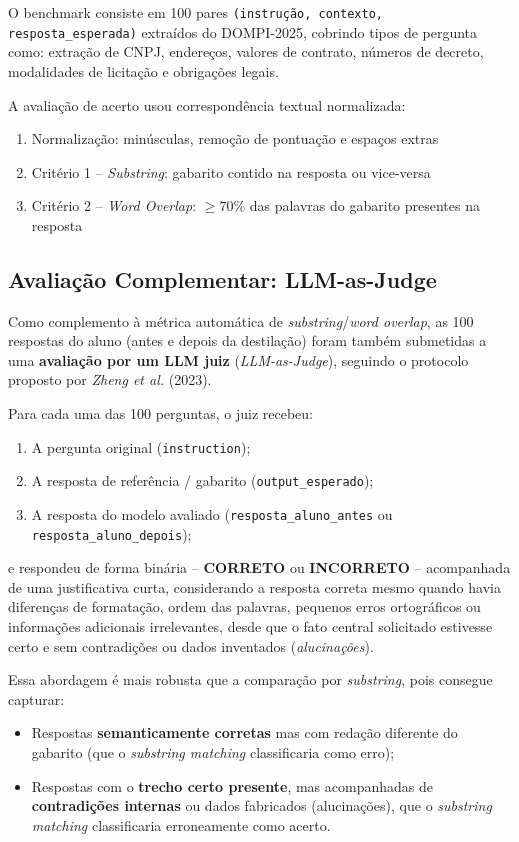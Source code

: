 \documentclass[12pt, a4paper]{article}
\begin{document}
O benchmark consiste em 100 pares \texttt{(instrução, contexto, resposta\_esperada)}
extraídos do DOMPI-2025, cobrindo tipos de pergunta como:
extração de CNPJ, endereços, valores de contrato, números de decreto, modalidades de
licitação e obrigações legais.

A avaliação de acerto usou correspondência textual normalizada:
\begin{enumerate}
  \item Normalização: minúsculas, remoção de pontuação e espaços extras
  \item Critério 1 -- \textit{Substring}: gabarito contido na resposta ou vice-versa
  \item Critério 2 -- \textit{Word Overlap}: $\geq 70\%$ das palavras do gabarito
        presentes na resposta
\end{enumerate}

\subsection{Avaliação Complementar: LLM-as-Judge}

Como complemento à métrica automática de \textit{substring}/\textit{word overlap},
as 100 respostas do aluno (antes e depois da destilação) foram também submetidas a
uma \textbf{avaliação por um LLM juiz} (\textit{LLM-as-Judge}), seguindo o protocolo
proposto por \textit{Zheng et al.} (2023).

Para cada uma das 100 perguntas, o juiz recebeu:
\begin{enumerate}
  \item A pergunta original (\texttt{instruction});
  \item A resposta de referência / gabarito (\texttt{output\_esperado});
  \item A resposta do modelo avaliado (\texttt{resposta\_aluno\_antes} ou
        \texttt{resposta\_aluno\_depois});
\end{enumerate}
e respondeu de forma binária -- \textbf{CORRETO} ou \textbf{INCORRETO} -- acompanhada
de uma justificativa curta, considerando a resposta correta mesmo quando havia
diferenças de formatação, ordem das palavras, pequenos erros ortográficos ou
informações adicionais irrelevantes, desde que o fato central solicitado estivesse
certo e sem contradições ou dados inventados (\textit{alucinações}).

Essa abordagem é mais robusta que a comparação por \textit{substring}, pois consegue
capturar:
\begin{itemize}
  \item Respostas \textbf{semanticamente corretas} mas com redação diferente do gabarito
        (que o \textit{substring matching} classificaria como erro);
  \item Respostas com o \textbf{trecho certo presente}, mas acompanhadas de
        \textbf{contradições internas} ou dados fabricados (alucinações), que o
        \textit{substring matching} classificaria erroneamente como acerto.
\end{itemize}
\end{document}
